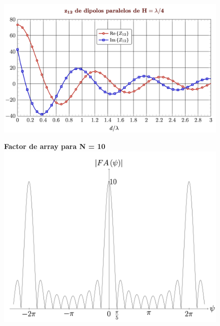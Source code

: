 \documentclass[twocolumn, 8pt]{extarticle}
\begin{document}
\begin{figure}[H]
    \centering
    \includegraphics[width=\columnwidth]{z_dipolos.png}
\end{figure}

\begin{figure}[H]
    \centering
    \textbf{Factor de array para N = 10}
    \includegraphics[width=\columnwidth]{fa.png}
\end{figure}

\newpage
\end{document}
